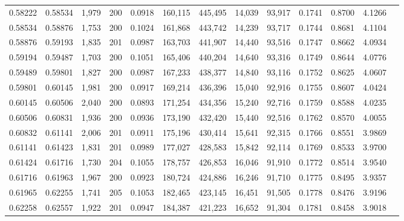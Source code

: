 \begin{tabular}{rrrrrrrrrrrrr}
0.58222 & 0.58534 & 1,979 & 200 &                                     0.0918 & 160,115 & 445,495 &  14,039 &  93,917 & 0.1741 & 0.8700 & 4.1266 \\
0.58534 & 0.58876 & 1,753 & 200 &                                     0.1024 & 161,868 & 443,742 &  14,239 &  93,717 & 0.1744 & 0.8681 & 4.1104 \\
0.58876 & 0.59193 & 1,835 & 201 &                                     0.0987 & 163,703 & 441,907 &  14,440 &  93,516 & 0.1747 & 0.8662 & 4.0934 \\
0.59194 & 0.59487 & 1,703 & 200 &                                     0.1051 & 165,406 & 440,204 &  14,640 &  93,316 & 0.1749 & 0.8644 & 4.0776 \\
0.59489 & 0.59801 & 1,827 & 200 &                                     0.0987 & 167,233 & 438,377 &  14,840 &  93,116 & 0.1752 & 0.8625 & 4.0607 \\
0.59801 & 0.60145 & 1,981 & 200 &                                     0.0917 & 169,214 & 436,396 &  15,040 &  92,916 & 0.1755 & 0.8607 & 4.0424 \\
0.60145 & 0.60506 & 2,040 & 200 &                                     0.0893 & 171,254 & 434,356 &  15,240 &  92,716 & 0.1759 & 0.8588 & 4.0235 \\
0.60506 & 0.60831 & 1,936 & 200 &                                     0.0936 & 173,190 & 432,420 &  15,440 &  92,516 & 0.1762 & 0.8570 & 4.0055 \\
0.60832 & 0.61141 & 2,006 & 201 &                                     0.0911 & 175,196 & 430,414 &  15,641 &  92,315 & 0.1766 & 0.8551 & 3.9869 \\
0.61141 & 0.61423 & 1,831 & 201 &                                     0.0989 & 177,027 & 428,583 &  15,842 &  92,114 & 0.1769 & 0.8533 & 3.9700 \\
0.61424 & 0.61716 & 1,730 & 204 &                                     0.1055 & 178,757 & 426,853 &  16,046 &  91,910 & 0.1772 & 0.8514 & 3.9540 \\
0.61716 & 0.61963 & 1,967 & 200 &                                     0.0923 & 180,724 & 424,886 &  16,246 &  91,710 & 0.1775 & 0.8495 & 3.9357 \\
0.61965 & 0.62255 & 1,741 & 205 &                                     0.1053 & 182,465 & 423,145 &  16,451 &  91,505 & 0.1778 & 0.8476 & 3.9196 \\
0.62258 & 0.62557 & 1,922 & 201 &                                     0.0947 & 184,387 & 421,223 &  16,652 &  91,304 & 0.1781 & 0.8458 & 3.9018 \\

\end{tabular}
